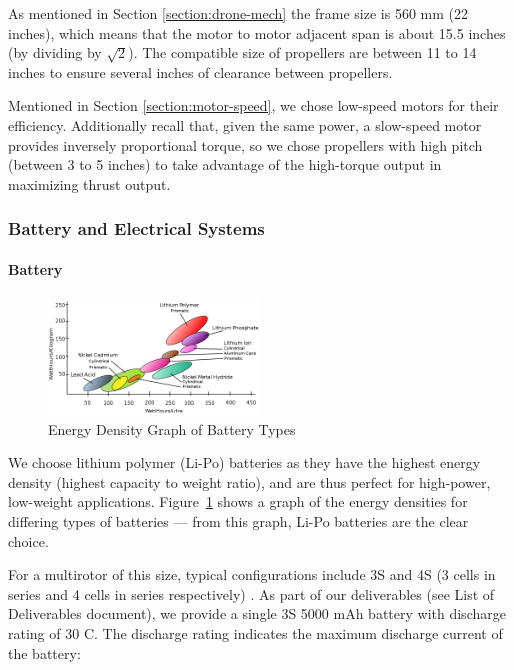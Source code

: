 As mentioned in Section \ref{section:drone-mech} the frame size is 560 mm (22 inches), which means that the motor to motor adjacent span is about 15.5 inches (by dividing by $\sqrt{2}$). The  compatible size of propellers are between 11 to 14 inches to ensure several inches of clearance between propellers.

Mentioned in Section \ref{section:motor-speed}, we chose low-speed motors for their efficiency. Additionally recall that, given the same power, a slow-speed motor provides inversely proportional torque, so we chose propellers with high pitch (between 3 to 5 inches) to take advantage of the high-torque output in maximizing thrust output.

\subsubsection{Battery and Electrical Systems}

\paragraph{Battery}

\begin{figure}[h]
    \centering
    \includegraphics[width=0.5\textwidth]{img/energydensity.png}
    \caption{Energy Density Graph of Battery Types}
    \label{fig:batterytypes}
\end{figure}

We choose lithium polymer (Li-Po) batteries as they have the highest energy density (highest capacity to weight ratio), and are thus  perfect for high-power, low-weight applications. Figure~\ref{fig:batterytypes} shows a graph of the energy densities for differing types of batteries \cite{battery} --- from this graph, Li-Po batteries are the clear choice.


For a multirotor of this size, typical configurations include 3S and 4S (3 cells in series and 4 cells in series respectively) . As part of our deliverables (see List of Deliverables document), we provide a single 3S 5000 mAh battery with discharge rating of 30 C. The discharge rating indicates the maximum discharge current of the battery\cite{crate}:

